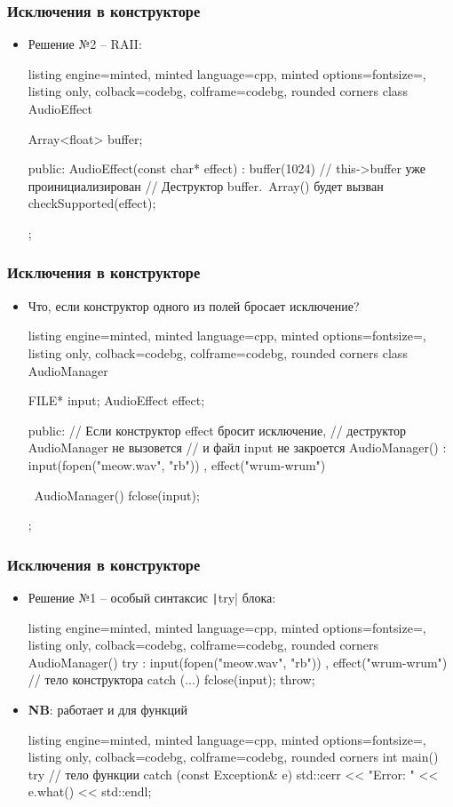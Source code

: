 \documentclass[10pt]{beamer}
\begin{document}
\begin{frame}[fragile]
\frametitle{Исключения в конструкторе}
\begin{itemize}
\item Решение №2 -- RAII:
\begin{tcblisting}{listing engine=minted, minted language=cpp, minted options={fontsize=\scriptsize}, listing only, colback=codebg, colframe=codebg, rounded corners}
class AudioEffect {
  Array<float> buffer;

public:
  AudioEffect(const char* effect)
    : buffer(1024)
  {
    // this->buffer уже проинициализирован
    // Деструктор buffer.~Array() будет вызван
    checkSupported(effect);
  }
};
\end{tcblisting}
\end{itemize}
\end{frame}

\begin{frame}[fragile]
\frametitle{Исключения в конструкторе}
\begin{itemize}
\item Что, если конструктор одного из полей бросает исключение?
\begin{tcblisting}{listing engine=minted, minted language=cpp, minted options={fontsize=\scriptsize}, listing only, colback=codebg, colframe=codebg, rounded corners}
class AudioManager {
  FILE* input;
  AudioEffect effect;

public:
  // Если конструктор effect бросит исключение,
  // деструктор AudioManager не вызовется
  // и файл input не закроется
  AudioManager()
    : input(fopen("meow.wav", "rb"))
    , effect("wrum-wrum")
  {}

  ~AudioManager() {
    fclose(input);
  }
};
\end{tcblisting}
\end{itemize}
\end{frame}

\begin{frame}[fragile]
\frametitle{Исключения в конструкторе}
\begin{itemize}
\item Решение №1 -- особый синтаксис \texttt|try| блока:
\begin{tcblisting}{listing engine=minted, minted language=cpp, minted options={fontsize=\scriptsize}, listing only, colback=codebg, colframe=codebg, rounded corners}
AudioManager() try
  : input(fopen("meow.wav", "rb"))
  , effect("wrum-wrum")
{
  // тело конструктора
}
catch (...) {
  fclose(input);
  throw;
}
\end{tcblisting}
\pause
\item \textbf{NB}: работает и для функций
\begin{tcblisting}{listing engine=minted, minted language=cpp, minted options={fontsize=\scriptsize}, listing only, colback=codebg, colframe=codebg, rounded corners}
int main() try {
  // тело функции
}
catch (const Exception& e) {
  std::cerr << "Error: " << e.what() << std::endl;
}
\end{tcblisting}
\end{itemize}
\end{frame}
\end{document}
